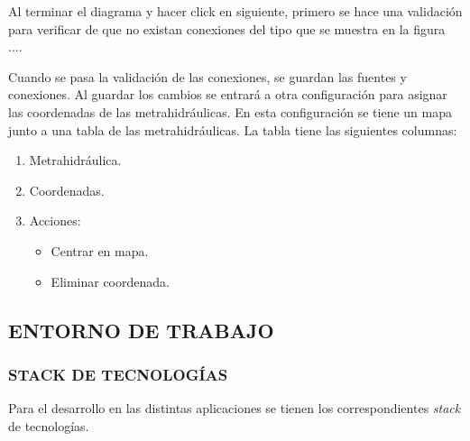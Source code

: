 Al terminar el diagrama y hacer click en siguiente, primero se hace una validación para verificar de que no existan conexiones del tipo que se muestra en la figura ....

Cuando se pasa la validación de las conexiones, se guardan las fuentes y conexiones. Al guardar los cambios se entrará a otra configuración para asignar las coordenadas de las metrahidráulicas.
En esta configuración se tiene un mapa junto a una tabla de las metrahidráulicas. La tabla tiene las siguientes columnas:
\begin{enumerate}
    \item Metrahidráulica.
    \item Coordenadas.
    \item Acciones:
          \begin{itemize}
            \item Centrar en mapa.
            \item Eliminar coordenada.
          \end{itemize}
\end{enumerate}

\subsection{ENTORNO DE TRABAJO}

\subsubsection{STACK DE TECNOLOGÍAS}

Para el desarrollo en las distintas aplicaciones se tienen los correspondientes \textit{stack} de tecnologías.

